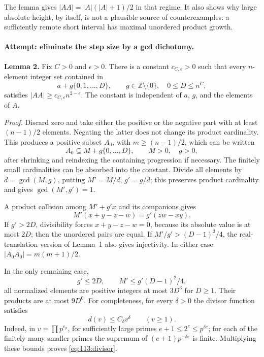 \documentclass[11pt,a4paper]{article}
\newcommand{\Z}{\mathbb{Z}}
\numberwithin{equation}{section}
\begin{document}
The lemma gives $|AA|=|A|(|A|+1)/2$ in that regime. It also shows why
large absolute height, by itself, is not a plausible source of
counterexamples: a sufficiently remote short interval has maximal
unordered product growth.

\paragraph{Attempt: eliminate the step size by a gcd dichotomy.}
\textbf{Lemma 2.} Fix $C>0$ and $\epsilon>0$. There is a constant
$c_{C,\epsilon}>0$ such that every $n$-element integer set contained in
\[
 a+g\{0,1,\ldots,D\},\qquad g\in\Z\setminus\{0\},\quad
 0\leq D\leq n^C,
\]
satisfies $|AA|\geq c_{C,\epsilon}n^{2-\epsilon}$.
The constant is independent of $a$, $g$, and the elements of $A$.

\emph{Proof.} Discard zero and take either the positive or the negative
part with at least $(n-1)/2$ elements. Negating the latter does not change
its product cardinality. This produces a positive subset $A_0$, with
$m\geq(n-1)/2$, which can be written
\[
 A_0\subseteq M+g\{0,\ldots,D\},\qquad M>0,\quad g>0,
\]
after shrinking and reindexing the containing progression if necessary.
The finitely small cardinalities can be absorbed into the constant.
Divide all elements by $d=\gcd(M,g)$, putting $M'=M/d$, $g'=g/d$;
this preserves product cardinality and gives $\gcd(M',g')=1$.

A product collision among $M'+g'x$ and its companions gives
\begin{equation}\label{eq:113:divisibility}
 M'(x+y-z-w)=g'(zw-xy).
\end{equation}
If $g'>2D$, divisibility forces $x+y-z-w=0$, because its absolute value
is at most $2D$; then the unordered pairs are equal. If
$M'/g'>(D-1)^2/4$, the real-translation version of Lemma~1 also gives
injectivity. In either case $|A_0A_0|=m(m+1)/2$.

In the only remaining case,
\[
 g'\leq2D,\qquad M'\leq g'(D-1)^2/4,
\]
all normalized elements are positive integers at most $3D^3$ for $D\geq1$.
Their products are at most $9D^6$. For completeness, for every $\delta>0$
the divisor function satisfies
\begin{equation}\label{eq:113:divisor}
 d(v)\leq C_\delta v^\delta\qquad(v\geq1).
\end{equation}
Indeed, in $v=\prod p^{e_p}$, for sufficiently large primes
$e+1\leq2^e\leq p^{\delta e}$; for each of the finitely many smaller
primes the supremum of $(e+1)p^{-\delta e}$ is finite. Multiplying these
bounds proves \eqref{eq:113:divisor}.
\end{document}
